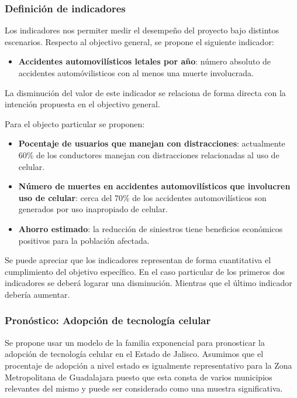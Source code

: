 \documentclass{article}
\begin{document}
\subsubsection{Definición de indicadores}

Los indicadores nos permiter medir el desempeño del proyecto bajo distintos escenarios.
Respecto al objectivo general, se propone el siguiente indicador:

\begin{itemize}
	\item \textbf{Accidentes automovilísticos letales por año}: número absoluto de accidentes automóvilisticos
con al menos una muerte involucrada.
\end{itemize}

La disminución del valor de este indicador se relaciona de forma directa con la intención propuesta en el objectivo general.

Para el objecto particular se proponen:

\begin{itemize}
	\item \textbf{Pocentaje de usuarios que manejan con distracciones}: actualmente 60\% de los conductores manejan con
distracciones relacionadas al uso de celular.
	\item \textbf{Número de muertes en accidentes automovilísticos que involucren uso de celular}: cerca del 70\% de los
accidentes automovilísticos son generados por uso inapropiado de celular.
	\item \textbf{Ahorro estimado}: la reducción de siniestros tiene beneficios económicos positivos para la población
afectada.
\end{itemize}

Se puede apreciar que los indicadores representan de forma cuantitativa el cumplimiento del objetivo específico.
En el caso particular de los primeros dos indicadores se deberá logarar una disminución. Mientras que el último
indicador debería aumentar.

\subsubsection{Pronóstico: Adopción de tecnología celular}

Se propone usar un modelo de la familia exponencial para pronosticar la adopción de tecnología celular en el Estado
de Jalisco. Asumimos que el procentaje de adopción a nivel estado es igualmente representativo para la Zona
Metropolitana de Guadalajara puesto que esta consta de varios municipios relevantes del mismo y
puede ser considerado como una muestra significativa.
\end{document}
